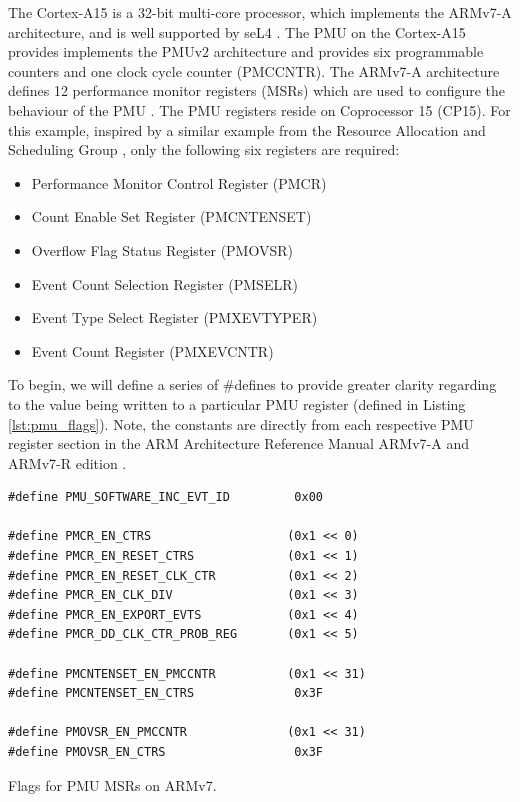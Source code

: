 {The Cortex-A15 is a 32-bit multi-core processor, which implements the ARMv7-A architecture, and is well supported by seL4 \cite{DocsSeL4Hardware}. The PMU on the Cortex-A15 provides implements the PMUv2 architecture and provides six programmable counters \cite{DocsArmCortexA15PMU} and one clock cycle counter (PMCCNTR). The ARMv7-A architecture defines 12 performance monitor registers (MSRs) which are used to configure the behaviour of the PMU \cite{DocsArmv7PMURegs}. The PMU registers reside on Coprocessor 15 (CP15). For this example, inspired by a similar example from the Resource Allocation and Scheduling Group \cite{TutHowToUsePMU}, only the following six registers are required:

\ssp

\begin{itemize}
    \item Performance Monitor Control Register (PMCR)
    \item Count Enable Set Register (PMCNTENSET)
    \item Overflow Flag Status Register (PMOVSR)
    \item Event Count Selection Register (PMSELR)
    \item Event Type Select Register (PMXEVTYPER)
    \item Event Count Register (PMXEVCNTR)
\end{itemize}

\dsp

To begin, we will define a series of \#defines to provide greater clarity regarding to the value being written to a particular PMU register (defined in Listing \ref{lst:pmu_flags}). Note, the constants are directly from each respective PMU register section in the ARM Architecture Reference Manual ARMv7-A and ARMv7-R edition \cite{DocsArvm7}.

\begin{listing}
    \begin{verbatim}
#define PMU_SOFTWARE_INC_EVT_ID         0x00

#define PMCR_EN_CTRS                   (0x1 << 0)
#define PMCR_EN_RESET_CTRS             (0x1 << 1)
#define PMCR_EN_RESET_CLK_CTR          (0x1 << 2)
#define PMCR_EN_CLK_DIV                (0x1 << 3)
#define PMCR_EN_EXPORT_EVTS            (0x1 << 4)
#define PMCR_DD_CLK_CTR_PROB_REG       (0x1 << 5)

#define PMCNTENSET_EN_PMCCNTR          (0x1 << 31)
#define PMCNTENSET_EN_CTRS              0x3F

#define PMOVSR_EN_PMCCNTR              (0x1 << 31)
#define PMOVSR_EN_CTRS                  0x3F
    \end{verbatim}
    \caption{Flags for PMU MSRs on ARMv7.}
    \label{lst:pmu_flags}
\end{listing}

}
